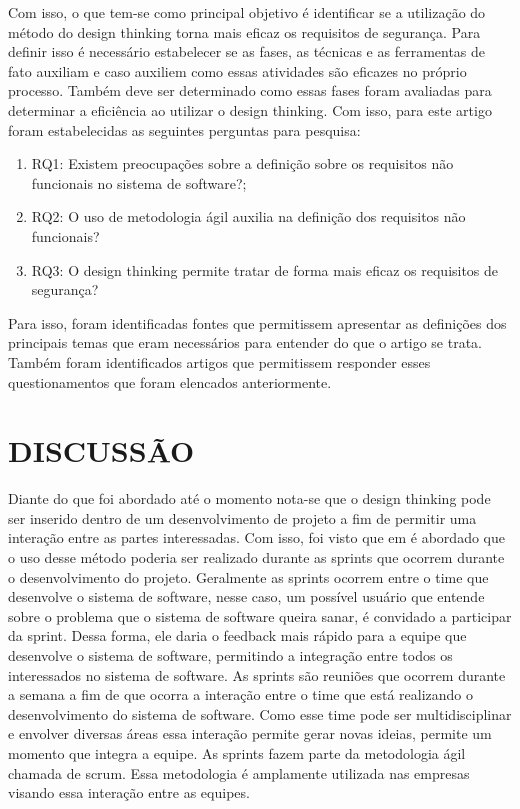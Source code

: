 \documentclass[a4paper,twoside]{article}
\begin{document}
Com isso, o que tem-se como principal objetivo é identificar se a utilização do método do design thinking torna mais eficaz os requisitos de segurança. Para definir isso é necessário estabelecer se as fases, as técnicas e as ferramentas de fato auxiliam e caso auxiliem como essas atividades são eficazes no próprio processo. Também deve ser determinado como essas fases foram avaliadas para determinar a eficiência ao utilizar o design thinking. Com isso, para este artigo foram estabelecidas as seguintes perguntas para pesquisa:
\begin{enumerate}
    \item RQ1: Existem preocupações sobre a definição sobre os requisitos não funcionais no sistema de software?;
    \item RQ2: O uso de metodologia ágil auxilia na definição dos requisitos não funcionais?
    \item RQ3: O design thinking permite tratar de forma mais eficaz os requisitos de segurança?
\end{enumerate}

Para isso, foram identificadas fontes que permitissem apresentar as definições dos principais temas que eram necessários para entender do que o artigo se trata. Também foram identificados  artigos que permitissem responder esses questionamentos que foram elencados anteriormente.

\section{\uppercase{Discussão}}

Diante do que foi abordado até o momento nota-se que o design thinking pode ser inserido dentro de um desenvolvimento de projeto a fim de permitir uma interação entre as partes interessadas. Com isso, foi visto que em \cite{DBLP:journals/information/MartinsJCKPO19} é abordado que o uso desse método poderia ser realizado durante as sprints que ocorrem durante o desenvolvimento do projeto. Geralmente as sprints ocorrem entre o time que desenvolve o sistema de software, nesse caso, um possível usuário que entende sobre o problema que o sistema de software queira sanar, é convidado a participar da sprint. Dessa forma, ele daria o feedback mais rápido para a equipe que desenvolve o sistema de software, permitindo a integração entre todos os interessados no sistema de software. As sprints são reuniões que ocorrem durante a semana a fim de que ocorra a interação entre o time que está realizando o desenvolvimento do sistema de software. Como esse time pode ser multidisciplinar e envolver diversas áreas essa interação permite gerar novas ideias, permite um momento que integra a equipe. As sprints fazem parte da metodologia ágil chamada de scrum. Essa metodologia é amplamente utilizada nas empresas visando essa interação entre as equipes.
\end{document}
